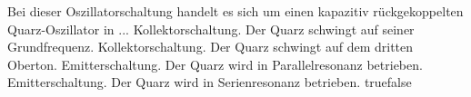     { Bei dieser Oszillatorschaltung handelt es sich um einen kapazitiv rückgekoppelten Quarz-Oszillator in ...}
    {Kollektorschaltung. Der Quarz schwingt auf seiner Grundfrequenz.}
    {Kollektorschaltung. Der Quarz schwingt auf dem dritten Oberton.}
    {Emitterschaltung. Der Quarz wird in Parallelresonanz betrieben.}
    {Emitterschaltung. Der Quarz wird in Serienresonanz betrieben.}
    {true}{false}